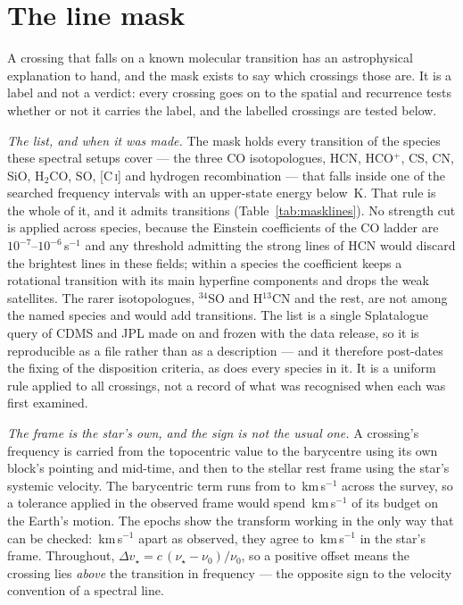 \section{The line mask}
\label{app:linemask}

A crossing that falls on a known molecular transition has an astrophysical
explanation to hand, and the mask exists to say which crossings those are. It
is a label and not a verdict: every crossing goes on to the spatial and
recurrence tests whether or not it carries the label, and the labelled
crossings are tested below.

\emph{The list, and when it was made.} The mask holds every transition of the
\FrNSpec{} species these spectral setups cover --- the three CO isotopologues,
HCN, HCO$^{+}$, CS, CN, SiO, H$_2$CO, SO, [C\,\textsc{i}] and hydrogen
recombination --- that falls inside one of the \McNIsland{} searched frequency
intervals with an upper-state energy below \McEuMax\,K. That rule is the whole
of it, and it admits \FrNTrans{} transitions
(Table~\ref{tab:masklines}). No strength cut is applied across species,
because the Einstein coefficients of the CO ladder are
$10^{-7}$--$10^{-6}$\,s$^{-1}$ and any threshold admitting the strong lines of
HCN would discard the brightest lines in these fields; within a species the
coefficient keeps a rotational transition with its main hyperfine components
and drops the weak satellites. The rarer isotopologues, $^{34}$SO and
H$^{13}$CN and the rest, are not among the named species and would add
\McNRare{} transitions. The list is a single Splatalogue query of CDMS and JPL
\citep{Pickett1998,CDMS2005} made on \MkListDate{} and frozen with the data
release, so it is reproducible as a file rather than as a description --- and
it therefore post-dates the \MkCritDate{} fixing of the disposition criteria,
as does every species in it. It is a uniform rule applied to all \NCross{}
crossings, not a record of what was recognised when each was first examined.

\emph{The frame is the star's own, and the sign is not the usual one.} A
crossing's frequency is carried from the topocentric value to the barycentre
using its own block's pointing and mid-time, and then to the stellar rest
frame using the star's systemic velocity. The barycentric term runs from
\FrBaryLo{} to \FrBaryHi\,km\,s$^{-1}$ across the survey, so a tolerance
applied in the observed frame would spend \FrBarySwing\,km\,s$^{-1}$ of its
budget on the Earth's motion. The \FrEpochNEpoch{} \FrEpochStar{} epochs show
the transform working in the only way that can be checked:
\FrEpochTopoKms\,km\,s$^{-1}$ apart as observed, they agree to
\FrEpochStelKms\,km\,s$^{-1}$ in the star's frame. Throughout,
$\Delta v_\star = c\,(\nu_\star-\nu_0)/\nu_0$, so a positive offset means the
crossing lies \emph{above} the transition in frequency --- the opposite sign
to the velocity convention of a spectral line.

